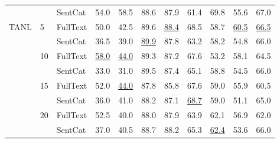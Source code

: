\begin{tabular}{lllllllllll}
    &    & SentCat &                       54.0 &                       58.5 &                       88.6 &                       87.9 &                       61.4 &                       69.8 &                       55.6 &                       67.0 \\
TANL & 5 & FullText &                       50.0 &                       42.5 &                       89.6 &           \underline{88.4} &                       68.5 &                       58.7 &           \underline{60.5} &           \underline{66.5} \\
    &    & SentCat &                       36.5 &                       39.0 &           \underline{89.9} &                       87.8 &                       63.2 &                       58.2 &                       54.8 &                       66.0 \\
    & 10 & FullText &           \underline{58.0} &           \underline{44.0} &                       89.3 &                       87.2 &                       67.6 &                       53.2 &                       58.1 &                       64.5 \\
    &    & SentCat &                       33.0 &                       31.0 &                       89.5 &                       87.4 &                       65.1 &                       58.8 &                       54.5 &                       66.0 \\
    & 15 & FullText &                       52.0 &           \underline{44.0} &                       87.8 &                       85.8 &                       67.6 &                       59.0 &                       55.9 &                       60.5 \\
    &    & SentCat &                       36.0 &                       41.0 &                       88.2 &                       87.1 &           \underline{68.7} &                       59.0 &                       51.1 &                       65.0 \\
    & 20 & FullText &                       52.5 &                       40.0 &                       88.0 &                       87.9 &                       63.9 &                       62.1 &                       56.9 &                       62.0 \\
    &    & SentCat &                       37.0 &                       40.5 &                       88.7 &                       88.2 &                       65.3 &           \underline{62.4} &                       53.6 &                       66.0 \\

\end{tabular}
